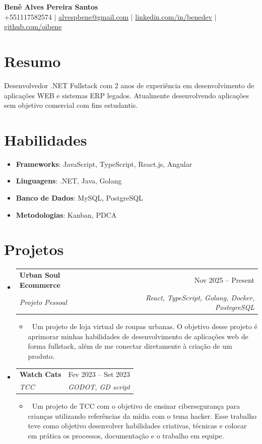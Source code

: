 \documentclass[letterpaper,10pt]{article}
\makeatletter
\newcommand{\resumeItem}[1]{\item\small{#1}}
\newcommand{\resumeSubheading}[4]{
\vspace{-1pt}\item
  \begin{tabular*}{0.97\textwidth}[t]{l@{\extracolsep{\fill}}r}
    \textbf{#1} & #2 \\
    \textit{#3} & \textit{#4} \\
  \end{tabular*}\vspace{-7pt}
}
\newcommand{\resumeSubHeadingList}{\begin{itemize}[leftmargin=0.15in, label={}]}
\newcommand{\resumeSubHeadingListEnd}{\end{itemize}}
\makeatother
\begin{document}
\begin{center}
  \textbf{\Huge Benê Alves Pereira Santos} \\
  \small +551117582574 $|$ \href{mailto:alvespbene@gmail.com}{alvespbene@gmail.com} $|$ 
  \href{https://linkedin.com/in/benedev}{linkedin.com/in/benedev} $|$
  \href{https://github.com/oibene}{github.com/oibene}
\end{center}

\section*{Resumo}
Desenvolvedor .NET Fullstack com 2 anos de experiência em desenvolvimento de aplicações WEB e sistemas ERP legados. Atualmente desenvolvendo aplicações sem objetivo comercial com fins estudantis.

\section{Habilidades}
\resumeSubHeadingList
  \resumeItem{\textbf{Frameworks}: JavaScript, TypeScript, React.js, Angular}
  \resumeItem{\textbf{Linguagens}: .NET, Java, Golang}
  \resumeItem{\textbf{Banco de Dados}: MySQL, PostgreSQL}
  \resumeItem{\textbf{Metodologias}: Kanban, PDCA}
\resumeSubHeadingListEnd

\section{Projetos}
\resumeSubHeadingList
  \resumeSubheading
      {Urban Soul Ecommerce}{Nov 2025 -- Present}
      {Projeto Pessoal}{React, TypeScript, Golang, Docker, PostegreSQL}
      \resumeSubHeadingList
          \resumeItem{\textbf\ Um projeto de loja virtual de roupas urbanas. O objetivo desse projeto é aprimorar minhas habilidades de desenvolvimento de aplicações web de forma fullstack, além de me conectar diretamente à criação de um produto.}
      \resumeSubHeadingListEnd
  \resumeSubheading
      {Watch Cats}{Fev 2023 -- Set 2023} 
      {TCC}{GODOT, GD script}
      \resumeSubHeadingList
          \resumeItem{\textbf\ Um projeto de TCC com o objetivo de ensinar cibersegurança para crianças utilizando referências da mídia com o tema hacker. Esse trabalho teve como objetivo desenvolver habilidades criativas, técnicas e colocar em prática os processos, documentação e o trabalho em equipe.}
      \resumeSubHeadingListEnd
\resumeSubHeadingListEnd
\end{document}
